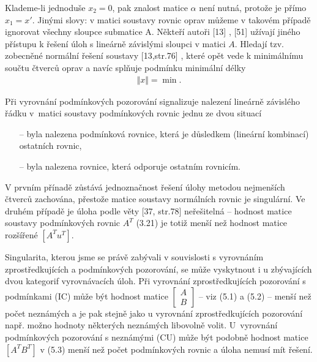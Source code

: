 \noindent Klademe-li jednoduše $x_2=0$, pak znalost matice $\alpha$
není nutná, protože je přímo $x_1=x'$. Jinými slovy: v matici soustavy
rovnic oprav můžeme v takovém případě ignorovat všechny sloupce
submatice A. Někteří autoři [13] , [51] užívají jiného přístupu k
řešení úloh s lineárně závislými sloupci v matici $A$. Hledají
tzv. zobecněné normální řešení soustavy [13,str.76] , které opět vede
k minimálnímu součtu čtverců oprav a navíc splňuje podmínku
minimální délky
%
\begin{align*}
  \tag{8.9}
  \Vert x \Vert = \min.
\end{align*}


Při vyrovnání podmínkových pozorování signalizuje nalezení
lineárně závislého řádku v~matici soustavy podmínkových rovnic
jednu ze dvou situací


\begin{itemize}
\item[--] byla nalezena podmínková rovnice, která je důsledkem
  (lineární kombinací) ostatních rovnic,

\item[--] byla nalezena rovnice, která odporuje ostatním rovnicím.
\end{itemize}

\noindent V prvním přínadě zůstává jednoznačnost řešení úlohy metodou
nejmenších čtverců zachována, přestože matice soustavy normálních
rovnic je singulární. Ve druhém případě je úloha podle
 věty [37, str.78] neřešitelná -- hodnost matice
soustavy podmínkových rovnic $A^T$ (3.21) je totiž menší než hodnost
matice rozšířené $\left[A^Tu^T\right]$.


Singularita, kterou jsme se právě zabývali v souvislosti s
vyrovnáním zprostředkujících a podmínkových pozorování, se může
vyskytnout i u zbývajících dvou kategorif vyrovnávacích úloh.
Při vyrovnání zprostředkujících pozorování s podmínkami (IC)
může být hodnost matice
$\left[
  \begin{array}{c}
    A \\ B
  \end{array}
  \right]$
-- viz (5.1) a (5.2) -- menší než počet
neznámých a je pak stejně jako u vyrovnání zprostředkujících
pozorování např. možno hodnoty některých neznámých libovolně volit.
U~vyrovnání podmínkových pozorování s neznámými (CU) může být
podobně hodnost matice $\left[ A^T B^T\right]$  v (5.3) menší než počet
podmínkových rovnic a úloha nemusí mít řešení.

